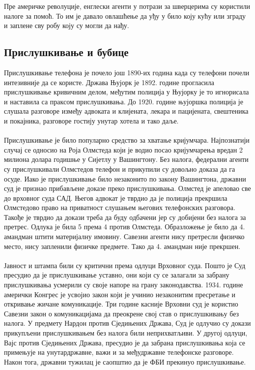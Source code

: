 \documentclass{article}
\begin{document}
Пре америчке револуције, енглески агенти у потрази за шверцерима су користили налоге за помоћ. То им је давало овлашћење да уђу у било коју кућу или зграду и заплене сву робу коју су могли да нађу. \\

\subsection{Прислушкивање и бубице}

Прислушкивање телефона је почело још 1890-их година када су телефони почели интезивније да се користе. Држава Њујорк је 1892. године прогласила прислушкивање кривичним делом, међутим полиција у Њујорку је то игнорисала и наставила са праксом прислушкивања. До 1920. године њујоршка полиција је слушала разговоре између адвоката и клијената, лекара и пацијената, свештеника и покајника, разговоре гостију унутар хотела и тако даље.
\\\\
Прислушкивање је било популарно средство за хватање кријумчара. Најпознатији случај се односио на Роја Олмстеда који је водио посао кријумчарења вредан 2 милиона долара годишње у Сијетлу у Вашингтону. Без налога, федерални агенти су прислушкивали Олмстедов телефон и прикупили су довољно доказа да га осуде. Иако је прислушкивање било незаконито по закону Вашингтона, државни суд је признао прибављене доказе преко прислушкивања. Олмстед је апеловао све до врховног суда САД. Његов адвокат је тврдио да је полиција прекршила Олмстедово право на приватност слушањем његових телефонских разговора. Такође је тврдио да докази треба да буду одбачени јер су добијени без налога за претрес. Одлука је била 5 према 4 против Олмстеда. Образложење је било да 4. амандман штити материјалну имовину. Савезни агенти нису претресли физичко место, нису запленили физичке предмете. Тако да 4. амандман није прекршен.
\\\\
Јавност и штампа били су критични према одлуци Врховног суда. Пошто је Суд пресудио да је прислушкивање уставно, они који су се залагали за забрану прислушкивања усмерили су своје напоре на грану законодавства. 1934. године амерички Конгрес је усвојио закон који је учинио незаконитим пресретање и откривање жичане комуникације. Три године касније Врховни суд је користио Савезни закон о комуникацијама да преокрене свој став о прислушкивању без налога. У предмету Нардон против Сједињених Држава, Суд је одлучио су докази прикупљени прислушкивањем без налога били неприхватљиви. У другој одлуци, Вајс против Сједињених Држава, пресудио је да забрана прислушкивања која се примењује на унутардржавне, важи и за међудржавне телефонске разговоре. Након тога, државни тужилац је саопштио да је ФБИ прекинуо прислушкивање.
\end{document}
